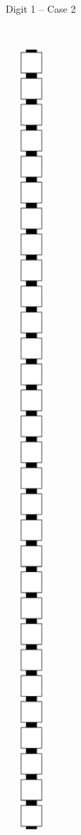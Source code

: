 \begin{itemize}
\begin{figure}[H]
\begin{subfigure}[t]{0.2\textwidth}
                    \caption{\label{fig:warping/pre_warp_case2_digit1_msr} Digit 1 -- Case 2}
                \end{subfigure}%
                ~
                \begin{subfigure}[t]{0.2\textwidth}
                    \centering
                    \includegraphics[width=0.2\textwidth]{warping/pre_warp_case2_digit2_msr}

\end{subfigure}
\end{figure}
\end{itemize}
